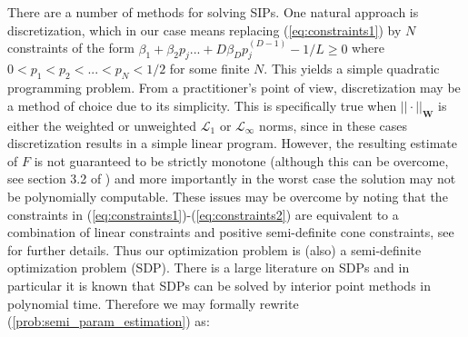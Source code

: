 \documentclass[twoside,11pt]{article}
\begin{document}
There are a number of methods for solving SIPs. One natural approach is discretization, which in our case means replacing (\ref{eq:constraints1}) by $N$ constraints of the form $\beta_1 + \beta_2 p_j...+ D \beta_D p_j^{(D-1)} - 1/L \geq 0$ where $0<p_1 < p_2 <...< p_N< 1/2$ for some finite $N$. This yields a simple quadratic programming problem. From a practitioner's point of view, discretization may be a method of choice due to its simplicity.  This is specifically true when $||\cdot||_{\boldsymbol{W}}$ is either the weighted or unweighted $\mathcal{L}_1$ or $\mathcal{L}_{\infty}$ norms, since in these cases discretization results in a simple linear program. However, the resulting estimate of $F$ is not guaranteed to be strictly monotone (although this can be overcome, see section 3.2 of \citealt{mutapcic}) and more importantly in the worst case the solution may not be polynomially computable. 
These issues may be overcome by noting that the constraints in  (\ref{eq:constraints1})-(\ref{eq:constraints2}) are equivalent to a combination of linear constraints and positive semi-definite cone constraints, see  \citet{parrilo} for further details. Thus our optimization problem is (also) a semi-definite optimization problem (SDP). There is a large literature on SDPs \citep{nemirovski} and in particular it is known that SDPs can be solved by interior point methods \citep{vandenberghe} in polynomial time. Therefore we may formally rewrite (\ref{prob:semi_param_estimation}) as:
\end{document}
